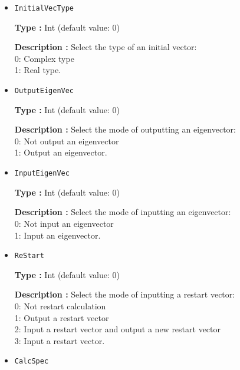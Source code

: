 \begin{itemize}
{\bf Type :} Int (default value: 0)

{\bf Description :} Select the method to calculate the eigenvectors:\\
0: Lanczos+CG methods (when the convergence of eigenvectors is not sufficient for using the Lanczos method, the CG method is applied to calculate eigenvectors).\\
1: Lanczos method.\\

\item  \verb|InitialVecType|

{\bf Type :} Int (default value: 0)

{\bf Description :} Select the type of an initial vector:\\
0: Complex type\\
1: Real type.\\

\item  \verb|OutputEigenVec|

{\bf Type :} Int (default value: 0)

{\bf Description :} Select the mode of outputting an eigenvector:\\
0: Not output an eigenvector\\
1: Output an eigenvector.\\


\item  \verb|InputEigenVec|

{\bf Type :} Int (default value: 0)

{\bf Description :} {Select the mode of inputting an eigenvector:\\
0: Not input an eigenvector\\
1: Input an eigenvector.\\
}

\item  \verb|ReStart|

{\bf Type :} {Int (default value: 0)}

{\bf Description :} {
Select the mode of inputting a restart vector:\\
0:  Not restart calculation\\
1:  Output a restart vector\\
2:  Input a restart vector and output a new restart vector\\
3: Input a restart vector.\\
}

\item  \verb|CalcSpec|


\end{itemize}
